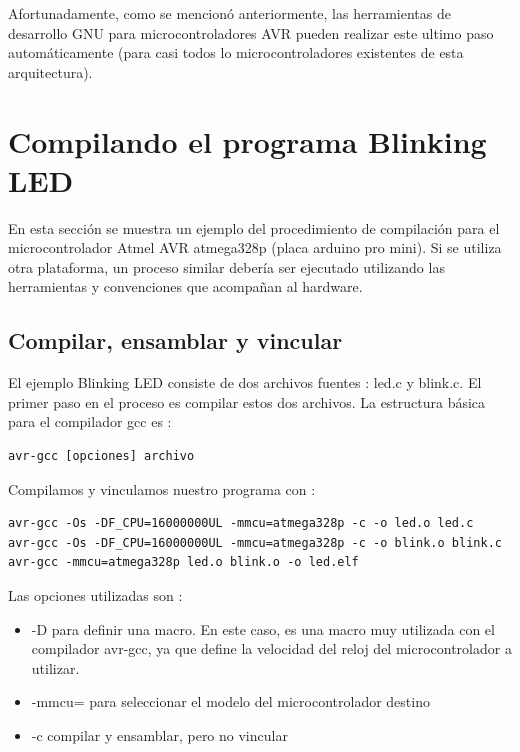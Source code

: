 \documentclass[12pt]{article}
\begin{document}
Afortunadamente, como se mencionó anteriormente, las herramientas de desarrollo
GNU para microcontroladores AVR pueden realizar este ultimo paso automáticamente
(para casi todos lo microcontroladores existentes de esta arquitectura).

\section *{Compilando el programa Blinking LED}

En esta sección se muestra un ejemplo del procedimiento de compilación 
para el microcontrolador Atmel AVR atmega328p (placa arduino pro mini).
Si se utiliza otra plataforma, un proceso similar debería ser ejecutado
utilizando las herramientas y convenciones que acompañan al hardware.

\subsection {Compilar, ensamblar y vincular}

El ejemplo Blinking LED consiste de dos archivos fuentes : led.c y blink.c.
El primer paso en el proceso es compilar estos dos archivos.
La estructura básica para el compilador gcc es :

\begin{verbatim}
avr-gcc [opciones] archivo
\end{verbatim}

Compilamos y vinculamos nuestro programa con :

\begin{verbatim}
avr-gcc -Os -DF_CPU=16000000UL -mmcu=atmega328p -c -o led.o led.c
avr-gcc -Os -DF_CPU=16000000UL -mmcu=atmega328p -c -o blink.o blink.c
avr-gcc -mmcu=atmega328p led.o blink.o -o led.elf
\end{verbatim}

Las opciones utilizadas son :

\begin{itemize}
\item -D para definir una macro. En este caso, es una macro muy utilizada
con el compilador avr-gcc, ya que define la velocidad del reloj del microcontrolador
a utilizar.
\item -mmcu= para seleccionar el modelo del microcontrolador destino 
\item -c compilar y ensamblar, pero no vincular
\end{itemize}


\end{document}
